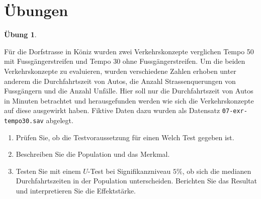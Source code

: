 \documentclass[
]{book}
\providecommand{\tightlist}{%
  \setlength{\itemsep}{0pt}\setlength{\parskip}{0pt}}
\theoremstyle{definition}
\theoremstyle{definition}
\theoremstyle{definition}
\newtheorem{exercise}{Übung}[chapter]
\theoremstyle{definition}
\theoremstyle{remark}
\begin{document}
\section{Übungen}\label{uxfcbungen-4}

\begin{exercise}
\protect\hypertarget{exr:tempo30}{}\label{exr:tempo30}\leavevmode

Für die Dorfstrasse in Köniz wurden zwei Verkehrskonzepte verglichen Tempo 50 mit Fussgängerstreifen und Tempo 30 ohne Fussgängerstreifen. Um die beiden Verkehrskonzepte zu evaluieren, wurden verschiedene Zahlen erhoben unter anderem die Durchfahrtszeit von Autos, die Anzahl Strassenquerungen von Fussgängern und die Anzahl Unfälle. Hier soll nur die Durchfahrtszeit von Autos in Minuten betrachtet und herausgefunden werden wie sich die Verkehrskonzepte auf diese ausgewirkt haben. Fiktive Daten dazu wurden als Datensatz \texttt{07-exr-tempo30.sav} abgelegt.

\begin{enumerate}
\def\labelenumi{\alph{enumi})}
\tightlist
\item
  Prüfen Sie, ob die Testvoraussetzung für einen Welch Test gegeben ist.
\item
  Beschreiben Sie die Population und das Merkmal.
\item
  Testen Sie mit einem \(U\)-Test bei Signifikanzniveau \(5\%\), ob sich die medianen Durchfahrtszeiten in der Population unterscheiden. Berichten Sie das Resultat und interpretieren Sie die Effektstärke.
\end{enumerate}

\end{exercise}
\end{document}
